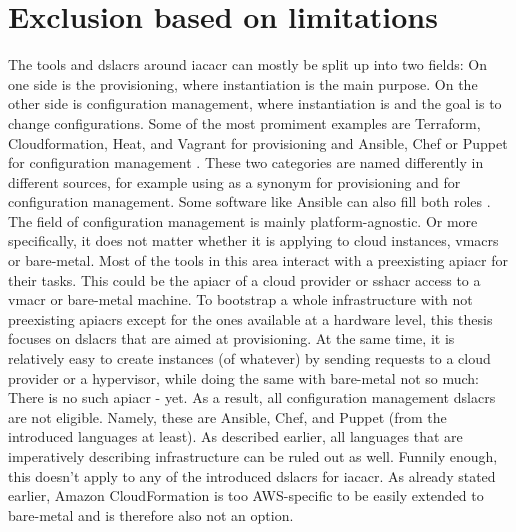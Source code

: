 \section{Exclusion based on limitations}
The tools and \gls{dslacr}s around \gls{iacacr} can mostly be split up into two fields: On one side is the provisioning, where instantiation is the main purpose. On the other side is configuration management, where instantiation is  and the goal is to change configurations. Some of the most promiment examples are Terraform, Cloudformation, Heat, and Vagrant for provisioning and Ansible, Chef or Puppet for configuration management \cite{iac_report} \cite{iac_oreilly} \cite{terraform_cloudformation} \cite{terraform_chef_puppet} \cite{atlassian_iac}.
\newline
These two categories are named differently in different sources, for example using  as a synonym for provisioning and  for configuration management. Some software like Ansible can also fill both roles \cite{iac_oreilly}.
\newline
The field of configuration management is mainly platform-agnostic. Or more specifically, it does not matter whether it is applying to cloud instances, \gls{vmacr}s or bare-metal. Most of the tools in this area interact with a preexisting \gls{apiacr} for their tasks. This could be the \gls{apiacr} of a cloud provider or \gls{sshacr} access to a \gls{vmacr} or bare-metal machine.
\newline
To bootstrap a whole infrastructure with not preexisting \gls{apiacr}s except for the ones available at a hardware level, this thesis focuses on \gls{dslacr}s that are aimed at provisioning. At the same time, it is relatively easy to create instances (of whatever) by sending requests to a cloud provider or a hypervisor, while doing the same with bare-metal not so much: There is no such \gls{apiacr} - yet.
\newline
As a result, all configuration management \gls{dslacr}s are not eligible. Namely, these are Ansible, Chef, and Puppet (from the introduced languages at least).
\newline
As described earlier, all languages that are imperatively describing infrastructure can be ruled out as well. Funnily enough, this doesn't apply to any of the introduced \gls{dslacr}s for \gls{iacacr}.
\newline
As already stated earlier, Amazon CloudFormation is too AWS-specific to be easily extended to bare-metal and is therefore also not an option.
